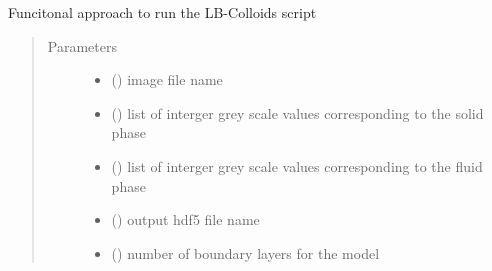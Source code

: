 \documentclass[letterpaper,10pt,english]{sphinxmanual}
\begin{document}

\begin{fulllineitems}
\label{\detokenize{index:lb_colloids.LB.LB_2Dimage.run}}
Funcitonal approach to run the LB-Colloids script
\begin{quote}\begin{description}
\item[{Parameters}] \leavevmode\begin{itemize}
\item {} 
 () \textendash{} image file name

\item {} 
 () \textendash{} list of interger grey scale values corresponding
to the solid phase

\item {} 
 () \textendash{} list of interger grey scale values corresponding
to the fluid phase

\item {} 
 () \textendash{} output hdf5 file name

\item {} 
 () \textendash{} number of boundary layers for the model

\end{itemize}

\end{description}\end{quote}

\begin{sphinxVerbatim}[commandchars=\\\{\}]
 \PYG{p}{[}\PYG{p}{]} \PYG{p}{[} \PYG{p}{]}
             
\end{sphinxVerbatim}

\end{fulllineitems}
\end{document}
